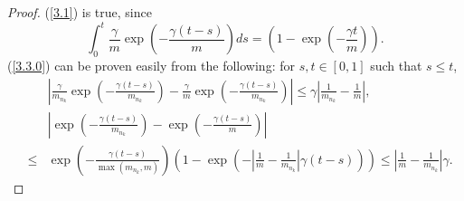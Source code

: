 \documentclass[12pt]{article}
\begin{document}
\begin{proof}
(\ref{3.1}) is true, since 
\begin{equation}\label{3.6}
\int_0^t \frac{\gamma}{m}\exp\left(-\frac{\gamma (t-s)}{m} \right)ds
=\left(1-\exp\left (-\frac{\gamma t}{m} \right)\right).
\end{equation}
 (\ref{3.3.0}) can be proven easily from the following: for $s,t\in [0,1]$ such that $ s\le t$,
\begin{eqnarray*}
&&\left|\frac{\gamma}{m_{n_{k}}}\exp\left(-\frac{\gamma(t-s)}{m_{n_{k}}}\right)-
\frac{\gamma}{m}\exp\left(-\frac{\gamma(t-s)}{m_{n_{k}}}\right)\right|
\le\gamma\left|\frac{1}{m_{n_k}}-\frac{1}{m}\right|, \\
&&\left|\exp\left(-\frac{\gamma(t-s)}{m_{n_{k}}}\right)-
\exp\left(-\frac{\gamma(t-s)}{m}\right)\right|\\
& \le& \exp\left(-\frac{\gamma(t-s)}{\max(m_{n_{k}},m)}\right)
\left(1-\exp\left(-\left|\frac{1}{m}-\frac{1}{m_{n_k}}\right|\gamma(t-s)\right)\right)
\le \left|\frac{1}{m}-\frac{1}{m_{n_k}}\right|\gamma.
\end{eqnarray*}


\end{proof}
\end{document}
